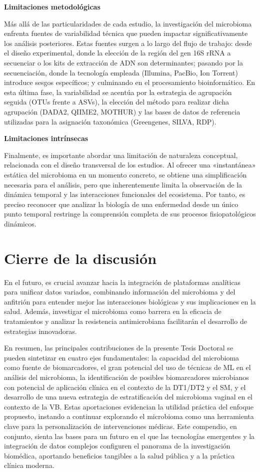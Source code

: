 \textbf{Limitaciones metodológicas}

Más allá de las particularidades de cada estudio, la investigación del microbioma enfrenta fuentes de variabilidad técnica que pueden impactar significativamente los análisis posteriores. Estas fuentes surgen a lo largo del flujo de trabajo: desde el diseño experimental, donde la elección de la región del gen 16S rRNA a secuenciar o los kits de extracción de ADN son determinantes; pasando por la secuenciación, donde la tecnología empleada (Illumina, PacBio, Ion Torrent) introduce sesgos específicos; y culminando en el procesamiento bioinformático. En esta última fase, la variabilidad se acentúa por la estrategia de agrupación seguida (OTUs frente a ASVs), la elección del método para realizar dicha agrupación (DADA2, QIIME2, MOTHUR) y las bases de datos de referencia utilizadas para la asignación taxonómica (Greengenes, SILVA, RDP).

\textbf{Limitaciones intrínsecas}

Finalmente, es importante abordar una limitación de naturaleza conceptual, relacionada con el diseño transversal de los estudios. Al ofrecer una «instantánea» estática del microbioma en un momento concreto, se obtiene una simplificación necesaria para el análisis, pero que inherentemente limita la observación de la dinámica temporal y las interacciones funcionales del ecosistema. Por tanto, es preciso reconocer que analizar la biología de una enfermedad desde un único punto temporal restringe la comprensión completa de sus procesos fisiopatológicos dinámicos.

\section{Cierre de la discusión}

En el futuro, es crucial avanzar hacia la integración de plataformas analíticas para unificar datos variados, combinando información del microbioma y del anfitrión para entender mejor las interacciones biológicas y sus implicaciones en la salud. Además, investigar el microbioma como barrera en la eficacia de tratamientos y analizar la resistencia antimicrobiana facilitarán el desarrollo de estrategias innovadoras.

En resumen, las principales contribuciones de la presente Tesis Doctoral se pueden sintetizar en cuatro ejes fundamentales: la capacidad del microbioma como fuente de biomarcadores, el gran potencial del uso de técnicas de ML en el análisis del microbioma, la identificación de posibles biomarcadores microbianos con potencial de aplicación clínica en el contexto de la DT1/DT2 y el SM, y el desarrollo de una nueva estrategia de estratificación del microbioma vaginal en el contexto de la VB. Estas aportaciones evidencian la utilidad práctica del enfoque propuesto, instando a continuar explorando el microbioma como una herramienta clave para la personalización de intervenciones médicas. Este compendio, en conjunto, sienta las bases para un futuro en el que las tecnologías emergentes y la integración de datos complejos configuren el panorama de la investigación biomédica, aportando beneficios tangibles a la salud pública y a la práctica clínica moderna.